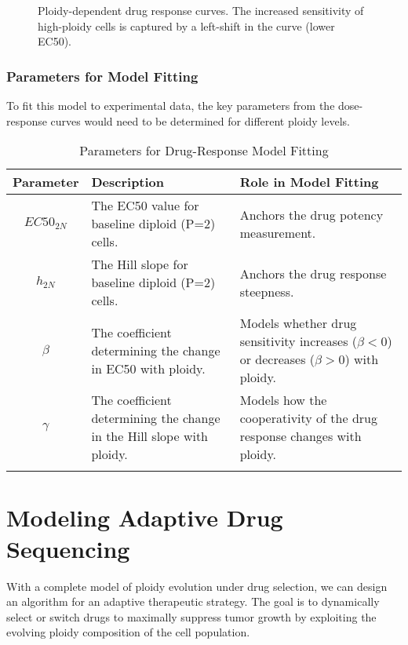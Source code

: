 \documentclass{article}
\begin{document}
\begin{figure}[h!]
\centering
{}
\caption{Ploidy-dependent drug response curves. The increased sensitivity of high-ploidy cells is captured by a left-shift in the curve (lower EC50).}
\label{fig:drug_response}
\end{figure}

\subsubsection*{Parameters for Model Fitting}
To fit this model to experimental data, the key parameters from the dose-response curves would need to be determined for different ploidy levels.

\begin{table}[h!]
\centering
\caption{\color{blue} Parameters for Drug-Response Model Fitting \color{black}}
\label{tab:drug_parameters}
\begin{tabular}{|c|p{5cm}|p{6cm}|}
\hline
\textbf{Parameter} & \textbf{Description} & \textbf{Role in Model Fitting} \\
\hline
$EC50_{2N}$ & The EC50 value for baseline diploid (P=2) cells. & Anchors the drug potency measurement. \\
\hline
$h_{2N}$ & The Hill slope for baseline diploid (P=2) cells. & Anchors the drug response steepness. \\
\hline
$\beta$ & The coefficient determining the change in EC50 with ploidy. & Models whether drug sensitivity increases ($\beta < 0$) or decreases ($\beta > 0$) with ploidy. \\
\hline
$\gamma$ & The coefficient determining the change in the Hill slope with ploidy. & Models how the cooperativity of the drug response changes with ploidy. \\
\hline
\label{drugresponse}
\end{tabular}
\end{table}


\section{Modeling Adaptive Drug Sequencing}
With a complete model of ploidy evolution under drug selection, we can design an algorithm for an adaptive therapeutic strategy. The goal is to dynamically select or switch drugs to maximally suppress tumor growth by exploiting the evolving ploidy composition of the cell population.
\end{document}
